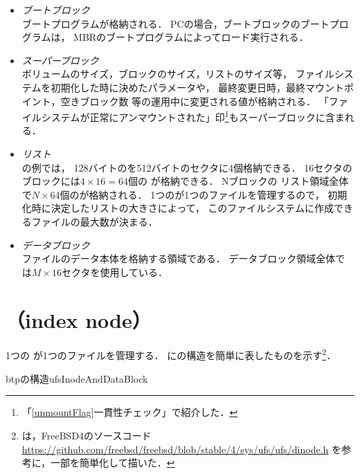 \begin{itemize}
\item \emph{ブートブロック}\\
  ブートプログラムが格納される．
  PCの場合，ブートブロックのブートプログラムは，
  MBRのブートプログラムによってロード実行される．
\item \emph{スーパーブロック}\\
  ボリュームのサイズ，ブロックのサイズ，\inode リストのサイズ等，
  ファイルシステムを初期化した時に決めたパラメータや，
  最終変更日時，最終マウントポイント，空きブロック数
  等の運用中に変更される値が格納される．
  「ファイルシステムが正常にアンマウントされた」印\footnote{
    「\ref{unmountFlag}一貫性チェック」で紹介した．
  }もスーパーブロックに含まれる．
\item \emph{\inode リスト}\\
  の例では，
  128バイトの\inode を512バイトのセクタに4個格納できる．
  16セクタのブロックには$4 \times 16 = 64$個の \inode が格納できる．
  Nブロックの \inode リスト領域全体で$N \times 64$個の\inode が格納される．
  1つの\inode が1つのファイルを管理するので，
  初期化時に決定した\inode リストの大きさによって，
  このファイルシステムに作成できるファイルの最大数が決まる．
\item \emph{データブロック}\\
  ファイルのデータ本体を格納する領域である．
  データブロック領域全体では$M \times 16$セクタを使用している．
\end{itemize}

\section{\inode （index node）}
1つの \inode が1つのファイルを管理する．
に\inode の構造を簡単に表したものを示す\footnote{
  は，FreeBSD4のソースコード
  \url{https://github.com/freebsd/freebsd/blob/stable/4/sys/ufs/ufs/dinode.h}
  を参考に，一部を簡単化して描いた．
}．

\begin{myfig}{btp}{\inode の構造}{ufsInodeAndDataBlock}
\end{myfig}

